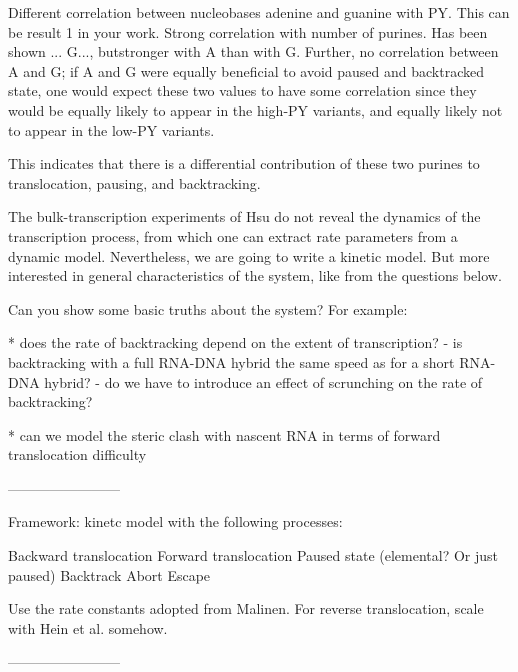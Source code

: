 Different correlation between nucleobases adenine and guanine with PY. This
can be result 1 in your work. Strong correlation with number of purines. Has
been shown ... G..., butstronger with A than with G. Further, no correlation
between A and G; if A and G were equally beneficial to avoid paused and
backtracked state, one would expect these two values to have some correlation
since they would be equally likely to appear in the high-PY variants, and
equally likely not to appear in the low-PY variants.

This indicates that there is a differential contribution of these two purines
to translocation, pausing, and backtracking.

The bulk-transcription experiments of Hsu do not reveal the dynamics of the
transcription process, from which one can extract rate parameters from a
dynamic model. Nevertheless, we are going to write a kinetic model. But more
interested in general characteristics of the system, like from the questions
below.

Can you show some basic truths about the system? For example:

* does the rate of backtracking depend on the extent of transcription?
    - is backtracking with a full RNA-DNA hybrid the same speed as for a short
    RNA-DNA hybrid?
    - do we have to introduce an effect of scrunching on the rate of backtracking?

* can we model the steric clash with nascent RNA in terms of forward
    translocation difficulty

------------------------

Framework: kinetc model with the following processes:

Backward translocation
Forward translocation
Paused state (elemental? Or just paused)
Backtrack
Abort
Escape

Use the rate constants adopted from Malinen. For reverse translocation, scale
with Hein et al. somehow.

------------------------

